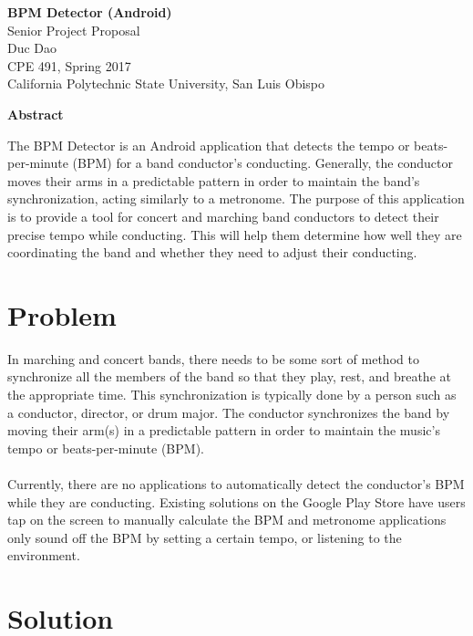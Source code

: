 \documentclass[12pt]{article}
\begin{document}
\begin{center}
  \vspace*{1in}
  \textbf{\LARGE{BPM Detector (Android)}} \\
  \large{Senior Project Proposal \\
  Duc Dao \\
  CPE 491, Spring 2017 \\
  California Polytechnic State University, San Luis Obispo} \\
\end{center}

\begin{center}
  \vspace*{2in}
  \textbf{Abstract} \\
\end{center}
The BPM Detector is an Android application that detects the tempo or beats-per-minute (BPM) for a band conductor's conducting. Generally, the conductor moves their arms in a predictable pattern in order to maintain the band's synchronization, acting similarly to a metronome. The purpose of this application is to provide a tool for concert and marching band conductors to detect their precise tempo while conducting. This will help them determine how well they are coordinating the band and whether they need to adjust their conducting.  

\newpage

\section{Problem}
In marching and concert bands, there needs to be some sort of method to synchronize all the members of the band so that they play, rest, and breathe at the appropriate time. This synchronization is typically done by a person such as a conductor, director, or drum major. The conductor synchronizes the band by moving their arm(s) in a predictable pattern in order to maintain the music's tempo or beats-per-minute (BPM).
\\
\\
Currently, there are no applications to automatically detect the conductor's BPM while they are conducting. Existing solutions on the Google Play Store have users tap on the screen to manually calculate the BPM and metronome applications only sound off the BPM by setting a certain tempo, or listening to the environment.  

\section{Solution}
\end{document}
